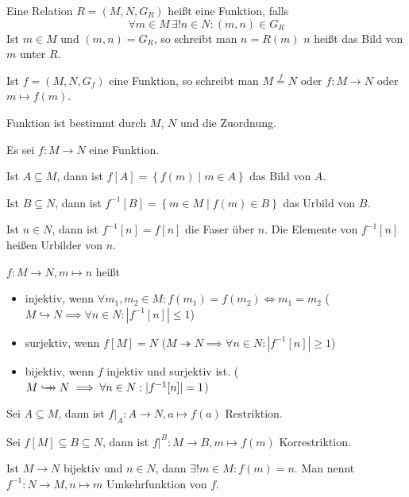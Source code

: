 \begin{definition}
  Eine Relation $R = (M, N, G_R)$ heißt eine Funktion, falls
  \[ \forall m \in M\, \exists! n \in N: (m, n) \in G_R \]
  Ist $m \in M$ und $(m, n) = G_R$, so schreibt man $n = R(m)$
  $n$ heißt das Bild von $m$ unter $R$.
\end{definition}
\begin{remark}
  Ist $f = (M, N, G_f)$ eine Funktion, so schreibt man $M \stackrel{f}{=} N$ oder $f: M \to N$ oder $m \mapsto f(m)$.\index[sym]{$\to$}\index[sym]{$\mapsto$}

  Funktion ist bestimmt durch $M$, $N$ und die Zuordnung.
\end{remark}
\begin{definition}
  Es sei $f: M \to N$ eine Funktion.

  Ist $A \subseteq M$, dann ist $f[A] = \left\{ f(m) \middle| m \in A \right\}$ das Bild von $A$.

  Ist $B \subseteq N$, dann ist $f^{-1}[B] = \left\{ m \in M \middle| f(m) \in B \right\}$ das Urbild von $B$.

  Ist $n \in N$, dann ist $f^{-1}[n] = f[{n}]$ die Faser über $n$. Die Elemente von $f^{-1}[n]$ heißen Urbilder von $n$.
\end{definition}
\begin{definition}
  $f: M \to N, m \mapsto n$ heißt
  \begin{itemize}
  \item injektiv, wenn $\forall m_1, m_2 \in M: f(m_1) = f(m_2) \iff m_1 = m_2$ ($M \hookrightarrow N \implies \forall n \in N: |f^{-1}[n]| \le 1$)
  \item surjektiv, wenn $f[M] = N$ ($M \twoheadrightarrow N \implies \forall n \in N: |f^{-1}[n]| \ge 1$)
  \item bijektiv, wenn $f$ injektiv und surjektiv ist. ($M \hookrightarrow\mathrel{\mspace{-13mu}}\rightarrow N \implies \forall n \in N: |f^{-1}[n]| = 1$)
  \end{itemize}
\end{definition}
\begin{definition}
  Sei $A \subseteq M$, dann ist $f|_A: A \to N, a \mapsto f(a)$ Restriktion.

  Sei $f[M] \subseteq B \subseteq N$, dann ist $f|^B: M \to B, m \mapsto f(m)$ Korrestriktion.
\end{definition}
\begin{remark}
  Ist $M \to N$ bijektiv und $n \in N$, dann $\exists! m \in M: f(m) = n$. Man nennt $f^{-1}: N \to M, n \mapsto m$ Umkehrfunktion von $f$.
\end{remark}

